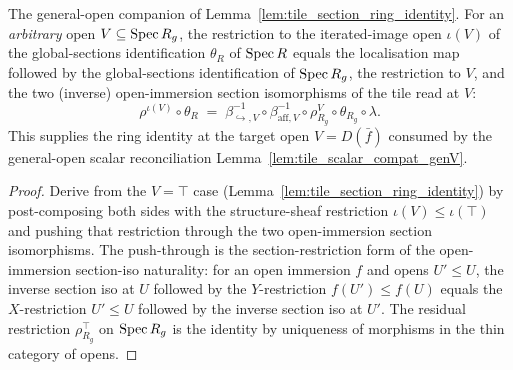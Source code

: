 \begin{lemma}
  \label{lem:tile_section_ring_identity_genV}
  The general-open companion of Lemma~\ref{lem:tile_section_ring_identity}. For an \emph{arbitrary}
  open \(V \subseteq \operatorname{Spec} R_g\), the restriction to the iterated-image open \(\iota(V)\) of the
  global-sections identification \(\theta_R\) of \(\operatorname{Spec} R\) equals the localisation map followed by the
  global-sections identification of \(\operatorname{Spec} R_g\), the restriction to \(V\), and the two (inverse)
  open-immersion section isomorphisms of the tile read at \(V\):
  \[
    \rho^{\iota(V)} \circ \theta_R
    \;=\;
    \beta_{\hookrightarrow,V}^{-1} \circ \beta_{\mathrm{aff},V}^{-1} \circ \rho^{V}_{R_g} \circ \theta_{R_g} \circ \lambda.
  \]
  This supplies the ring identity at the target open \(V = D(\bar f)\) consumed by the general-open
  scalar reconciliation Lemma~\ref{lem:tile_scalar_compat_genV}.
\end{lemma}
\begin{proof}
  Derive from the \(V = \top\) case (Lemma~\ref{lem:tile_section_ring_identity}) by post-composing both
  sides with the structure-sheaf restriction \(\iota(V) \le \iota(\top)\) and pushing that restriction
  through the two open-immersion section isomorphisms. The push-through is the section-restriction form
  of the open-immersion section-iso naturality: for an open immersion \(f\) and opens \(U' \le U\), the
  inverse section iso at \(U\) followed by the \(Y\)-restriction \(f(U') \le f(U)\) equals the
  \(X\)-restriction \(U' \le U\) followed by the inverse section iso at \(U'\). The residual restriction
  \(\rho^{\top}_{R_g}\) on \(\operatorname{Spec} R_g\) is the identity by
  uniqueness of morphisms in the thin category of opens.
\end{proof}

